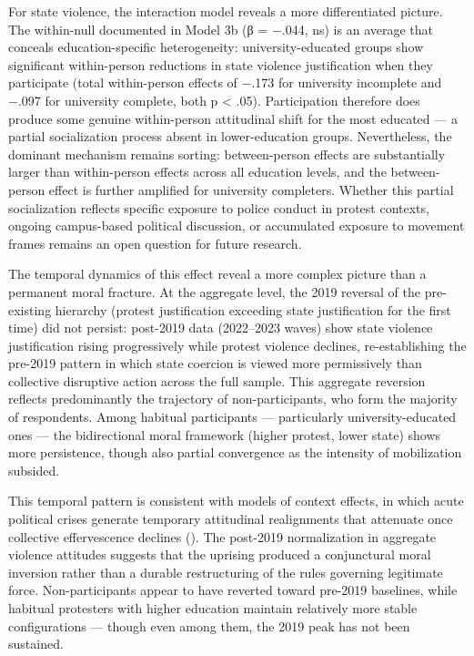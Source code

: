 \documentclass[
  13pt,
]{article}
\begin{document}
For state violence, the interaction model reveals a more differentiated
picture. The within-null documented in Model 3b (β = −.044, ns) is an
average that conceals education-specific heterogeneity:
university-educated groups show significant within-person reductions in
state violence justification when they participate (total within-person
effects of −.173 for university incomplete and −.097 for university
complete, both p \textless{} .05). Participation therefore does produce
some genuine within-person attitudinal shift for the most educated --- a
partial socialization process absent in lower-education groups.
Nevertheless, the dominant mechanism remains sorting: between-person
effects are substantially larger than within-person effects across all
education levels, and the between-person effect is further amplified for
university completers. Whether this partial socialization reflects
specific exposure to police conduct in protest contexts, ongoing
campus-based political discussion, or accumulated exposure to movement
frames remains an open question for future research.

The temporal dynamics of this effect reveal a more complex picture than
a permanent moral fracture. At the aggregate level, the 2019 reversal of
the pre-existing hierarchy (protest justification exceeding state
justification for the first time) did not persist: post-2019 data
(2022--2023 waves) show state violence justification rising
progressively while protest violence declines, re-establishing the
pre-2019 pattern in which state coercion is viewed more permissively
than collective disruptive action across the full sample. This aggregate
reversion reflects predominantly the trajectory of non-participants, who
form the majority of respondents. Among habitual participants ---
particularly university-educated ones --- the bidirectional moral
framework (higher protest, lower state) shows more persistence, though
also partial convergence as the intensity of mobilization subsided.

This temporal pattern is consistent with models of context effects, in
which acute political crises generate temporary attitudinal realignments
that attenuate once collective effervescence declines
(). The post-2019
normalization in aggregate violence attitudes suggests that the uprising
produced a conjunctural moral inversion rather than a durable
restructuring of the rules governing legitimate force. Non-participants
appear to have reverted toward pre-2019 baselines, while habitual
protesters with higher education maintain relatively more stable
configurations --- though even among them, the 2019 peak has not been
sustained.
\end{document}
